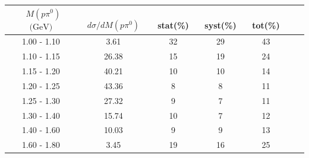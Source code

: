 \documentclass[aps, prd, reprint,showpacs,  preprintnumbers,amsmath,amssymb,superscriptaddress, nofootinbib]{revtex4-1}
\makeatletter
\renewenvironment{table}
  {\def\@captype{table}}
  {}
\makeatother
\begin{document}
\begin{table}
\centering
\begin{tabular}{ccccccc}
\hline
~$M(p\pi^{0})$ $\text{(GeV)}$ &~~ $d\sigma/dM(p\pi^{0})$ &~ stat(\%) &~ syst(\%) &~ tot(\%)  \\
\hline                                                                            
   1.00 - 1.10 &   3.61 &   32 &   29 &   43 \\
   1.10 - 1.15 &  26.38 &   15 &   19 &   24 \\
   1.15 - 1.20 &  40.21 &   10 &   10 &   14 \\
   1.20 - 1.25 &  43.36 &    8 &    8 &   11 \\
   1.25 - 1.30 &  27.32 &    9 &    7 &   11 \\
   1.30 - 1.40 &  15.74 &   10 &    7 &   12 \\
   1.40 - 1.60 &  10.03 &    9 &    9 &   13 \\
   1.60 - 1.80 &   3.45 &   19 &   16 &   25 \\
\hline\hline
\end{tabular}
\smallskip
\caption{Flux-averaged differential cross section in $p\pi^{0}$ invariant mass, 
$d\sigma/dM(p\pi^{0}) (10^{-40}\text{cm}^2/\text{nucleon}/(\text{GeV}))$, 
for $\pi^0$+nucleon(s) production with statistical (stat), systematic (syst), and total (tot) uncertainties.
NOTE: Result is for the $p\pi^{0}$ subsample with $T_{p}>100$\,MeV and $W<1.8$\,GeV.}
\label{tb:M-ppizW18}
\end{table}
\smallskip
\smallskip
\smallskip
\smallskip
\smallskip
\smallskip
\smallskip
\smallskip
\smallskip
\smallskip
\smallskip
\smallskip
\smallskip
\smallskip
\smallskip
\smallskip
\smallskip
\smallskip
\end{document}
